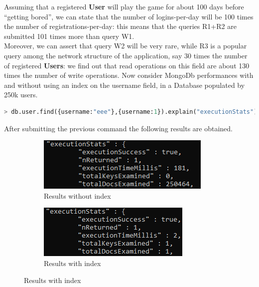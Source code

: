 Assuming that a registered \textbf{User} will play the game for about 100 days before “getting bored”, we can state that the number of logins-per-day will be 100 times the number of registrations-per-day: this means that the queries R1+R2 are submitted 101 times more than query W1.\\
Moreover, we can assert that query W2 will be very rare, while R3 is a popular query among the network structure of the application, say 30 times the number of registered \textbf{Users}: we find out that read operations on this field are about 130 times the number of write operations.
Now consider MongoDb performances with and without using an index on the username field, in a Database populated by 250k users.

\begin{lstlisting}[language=python]
	> db.user.find({username:"eee"},{username:1}).explain("executionStats")
\end{lstlisting}

After submitting the previous command the following results are obtained.

\begin{figure}[H]
	
	\begin{subfigure}{0.5\textwidth}
		\includegraphics[width=0.9\linewidth]{img/UsernameNoIndex.png} 
		\caption{Results without index}
	\end{subfigure}
	\begin{subfigure}{0.5\textwidth}
		\includegraphics[width=0.9\linewidth]{img/UsernameIndex.png}
		\caption{Results with index}
	\end{subfigure}
\end{figure}

